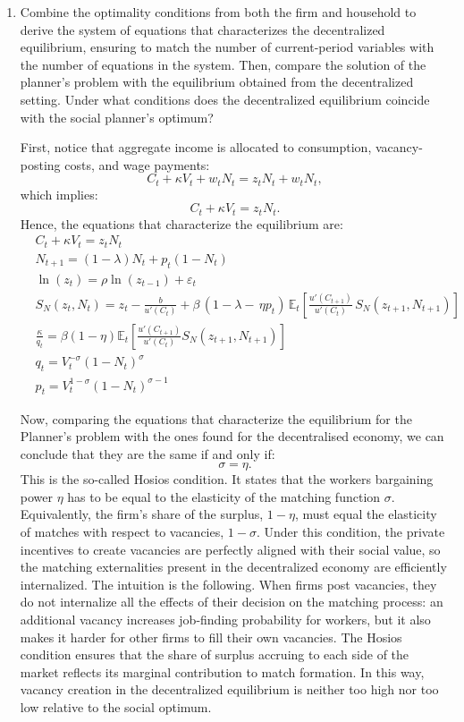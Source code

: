 \documentclass[dvipsnames,11pt]{article}
\begin{document}
\begin{enumerate}
\begin{solution}
\end{solution}

\item Combine the optimality conditions from both the firm and household to derive the system of equations that characterizes the decentralized equilibrium, ensuring to match the number of current-period variables with the number of equations in the system. Then, compare the solution of the planner’s problem with the equilibrium obtained from the decentralized setting. Under what conditions does the decentralized equilibrium coincide with the social planner’s optimum?

\begin{solution}
    First, notice that aggregate income is allocated to consumption, vacancy-posting costs, and wage payments:
    \[
    C_t+\kappa V_t+w_tN_t = z_tN_t+w_tN_t,
    \]
    which implies:
    \[
    C_t+\kappa V_t=z_tN_t.
    \]
    Hence, the equations that characterize the equilibrium are:
\begin{align*}
    & C_t+\kappa V_t=z_t N_t \\
    & N_{t+1}=(1-\lambda)N_t+p_t(1-N_t) \\
    &\ln (z_t)= \rho \ln (z_{t-1})+\varepsilon_t \\
    &S_N(z_t,N_t)
    = z_t - \frac{b}{u'(C_t)} + \beta\,\left(1-\lambda - \,\eta p_t\right)\,\mathbb{E}_t\left[\frac{u'(C_{t+1})}{u'(C_t)}\, S_N(z_{t+1},N_{t+1})\right] \\
    &\frac{\kappa}{q_t}=\beta(1-\eta) \mathbb{E}_t \left[\frac{u'(C_{t+1})}{u'(C_t)}S_N(z_{t+1},N_{t+1})\right] \\
    & q_t=V_t^{-\sigma}(1-N_t)^\sigma \\
    &p_t=V_t^{1-\sigma}(1-N_t)^{\sigma-1}
\end{align*}

Now, comparing the equations that characterize the equilibrium for the Planner's problem with the ones found for the decentralised economy, we can conclude that they are the same if and only if:
\[
\sigma =\eta.
\]
This is the so-called Hosios condition. It states that the workers bargaining power $\eta$ has to be equal to the elasticity of the matching function $\sigma$. Equivalently, the firm's share of the surplus, $1-\eta$, must equal the elasticity of matches with respect to vacancies, $1-\sigma$. Under this condition, the private incentives to create vacancies are perfectly aligned with their social value, so the matching externalities present in the decentralized economy are efficiently internalized. The intuition is the following. When firms post vacancies, they do not internalize all the effects of their decision on the matching process: an additional vacancy increases job-finding probability for workers, but it also makes it harder for other firms to fill their own vacancies. The Hosios condition ensures that the share of surplus accruing to each side of the market reflects its marginal contribution to match formation. In this way, vacancy creation in the decentralized equilibrium is neither too high nor too low relative to the social optimum.
\end{solution}


\end{enumerate}
\end{document}
